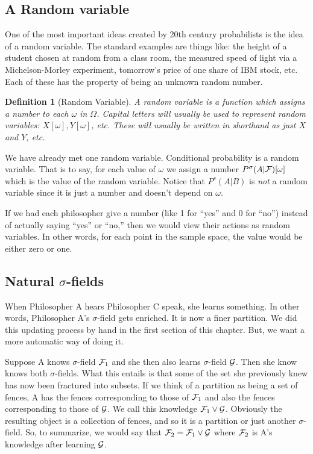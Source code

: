 \documentclass[14pt]{extarticle}
\newtheorem{definition}{Definition}
\begin{document}
        \subsection{A Random variable}
%

One of the most important ideas created by  20th century probabilists
is the idea of a random variable.  The standard examples are things
like: the height of a student chosen at random from a class room, the
measured speed of light via a Michelson-Morley experiment, tomorrow's
price of one share of IBM stock, etc.  Each of these has the property
of being an unknown random number.

\begin{definition}[Random Variable] \label{def:random_variable} A
  random variable is a function which assigns a number to each
  $\omega$ in $\Omega$.  Capital letters will usually be used to
  represent random variables: $X[\omega], Y[\omega]$, etc.  These
  will usually be written in shorthand as just $X$ and $Y$, etc.
\end{definition}

We have already met one random variable.  Conditional probability is a
random variable.  That is to say, for each value of $\omega$ we assign
a number $P^\sigma(A|{\cal F})[\omega]$ which is the value of the
random variable.  Notice that $P^s(A|B)$ is {\em not} a random
variable since it is just a number and doesn't depend on $\omega$.

If we had each philosopher give a number (like 1 for ``yes'' and 0 for
``no'') instead of actually saying ``yes'' or ``no,'' then we would
view their actions as random variables.  In other words, for each
point in the sample space, the value would be either zero or one.
 
        \subsection{Natural $\sigma$-fields}

When Philosopher A hears Philosopher C speak, she learns something.
In other words, Philosopher A's $\sigma$-field gets enriched.  It is
now a finer partition.  We did this updating process by hand in the
first section of this chapter.  But, we want a more automatic way of
doing it.  

Suppose A knows $\sigma$-field ${\cal F}_1$ and she then also learns
$\sigma$-field ${\cal G}$.  Then she know knows both
$\sigma$-fields.  What this entails is that some of the set she
previously knew has now been fractured into subsets.  If we think of
a partition as being a set of fences, A has the fences corresponding
to those of ${\cal F}_1$ and also the fences corresponding to those of ${\cal
  G}$.  We call this knowledge ${\cal F}_1 \vee {\cal G}$.  Obviously
the resulting object is a collection of fences, and so it is a
partition or just another $\sigma$-field.  So, to summarize, we
would say that ${\cal F}_2 = {\cal F}_1 \vee {\cal G}$ where ${\cal
  F}_2$ is A's knowledge after learning ${\cal G}$. 
\end{document}
